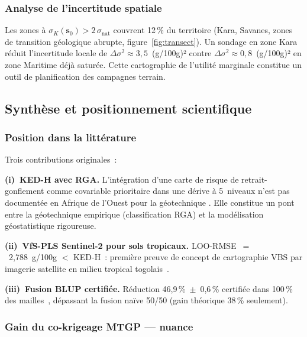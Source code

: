 \documentclass[10pt,a4paper,twocolumn]{article}
\newcommand{\bs}{\mathbf{s}}
\begin{document}
	\subsubsection{Analyse de l'incertitude spatiale}
	
	Les zones à $\sigma_K(\bs_0)>2\,\sigma_{\mathrm{nat}}$ couvrent
	12\,\% du territoire (Kara, Savanes, zones de transition géologique
	abrupte, figure~\ref{fig:transect}).
	Un sondage en zone Kara réduit l'incertitude locale de
	$\Delta\sigma^2\approx3{,}5$~(g/100g)² contre
	$\Delta\sigma^2\approx0{,}8$~(g/100g)² en zone Maritime
	déjà saturée. Cette cartographie de l'utilité marginale constitue
	un outil de planification des campagnes terrain.
	
	\subsection{Synthèse et positionnement scientifique}
	\label{subsec:synthese}
	
	\subsubsection{Position dans la littérature}
	
	Trois contributions originales~:
	
	\textbf{(i)~KED-H avec RGA.}
	L'intégration d'une carte de risque de retrait-gonflement comme
	covariable prioritaire dans une dérive à 5~niveaux n'est pas
	documentée en Afrique de l'Ouest pour la géotechnique
	\cite{odeh1994further}. Elle constitue un pont entre la
	géotechnique empirique (classification RGA) et la modélisation
	géostatistique rigoureuse.
	
	\textbf{(ii)~VfS-PLS Sentinel-2 pour sols tropicaux.}
	LOO-RMSE~$=$~2{,}788~g/100g $<$ KED-H~: première preuve de
	concept de cartographie VBS par imagerie satellite en milieu
	tropical togolais~\cite{viscarra2006data,castaldi2019sentinel}.
	
	\textbf{(iii)~Fusion BLUP certifiée.}
	Réduction 46{,}9\,\%~$\pm$~0{,}6\,\% certifiée dans
	100\,\% des mailles~\cite{chilesdelfiner2012}, dépassant
	la fusion naïve 50/50 (gain théorique 38\,\% seulement).
	
	\subsubsection{Gain du co-krigeage MTGP --- nuance}
\end{document}

